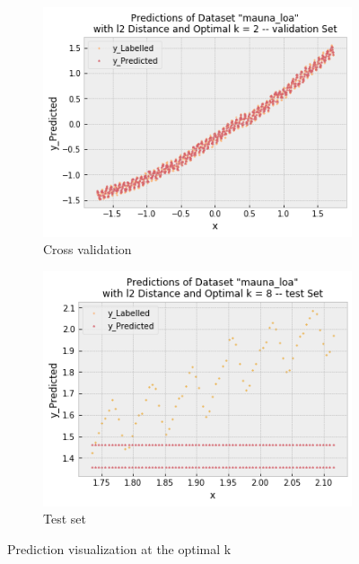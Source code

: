 \documentclass{article} %
\begin{document}
    \begin{figure}[!t]
      \centering
      \begin{subfigure}[b]{0.45\linewidth}
        \includegraphics[width=\linewidth]{output_13_1.png}
        \caption{Cross validation}
      \end{subfigure}
      \begin{subfigure}[b]{0.45\linewidth}
        \includegraphics[width=\linewidth]{output_13_3.png}
        \caption{Test set}
      \end{subfigure}
      \caption{Prediction visualization at the optimal k}
      \label{fig:Q1_2}
    \end{figure}
\end{document}

